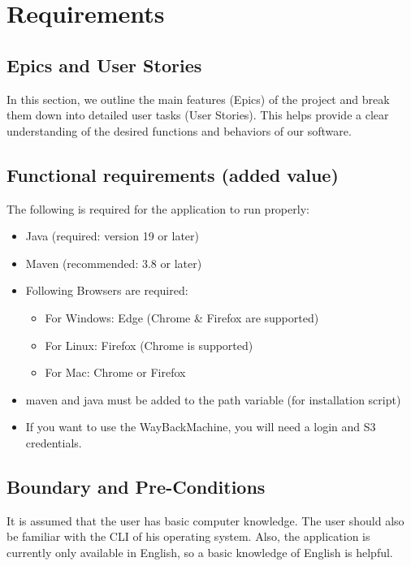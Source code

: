 \section{Requirements}

\subsection{Epics and User Stories}
In this section, we outline the main features (Epics) of the project and break them down into detailed user tasks (User Stories). This helps provide a clear understanding of the desired functions and behaviors of our software.






\subsection{Functional requirements (added value)}
The following is required for the application to run properly: 
\begin{itemize}
    \item Java (required: version 19 or later)
    \item Maven (recommended: 3.8 or later)
    \item Following Browsers are required: 
    \begin{itemize}
        \item For Windows: Edge (Chrome \& Firefox are supported)
        \item For Linux: Firefox (Chrome is supported)
        \item For Mac: Chrome or Firefox
    \end{itemize}
    \item maven and java must be added to the path variable (for installation script)
    \item If you want to use the WayBackMachine, you will need a login and S3 credentials.
\end{itemize}

\subsection{Boundary and Pre-Conditions}
It is assumed that the user has basic computer knowledge. The user should also be familiar with the CLI of his operating system.
Also, the application is currently only available in English, so a basic knowledge of English is helpful.
